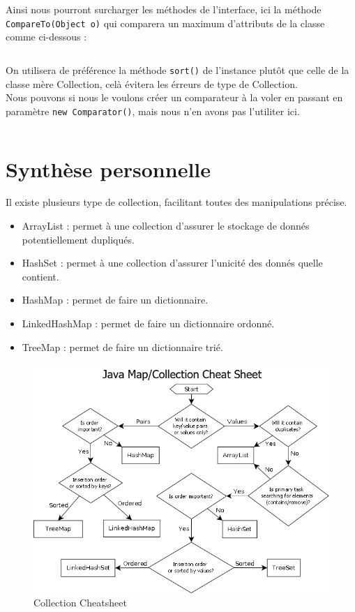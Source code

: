 Ainsi nous pourront surcharger les méthodes de l'interface, ici la méthode \texttt{CompareTo(Object o)} qui comparera un maximum d'attributs de la classe comme ci-dessous :
\inputminted[linenos,firstline=52,lastline=63]{java}{../sources/src/tp2/Cours.java}

On utilisera de préférence la méthode \texttt{sort()} de l'instance plutôt que celle de la classe mère Collection, celà évitera les érreurs de type de Collection.\\
Nous pouvons si nous le voulons créer un comparateur à la voler en passant en paramètre \texttt{new Comparator(){}}, mais nous n'en avons pas l'utiliter ici.
\inputminted[linenos,firstline=43,lastline=43]{java}{../sources/src/tp2/Main.java}

\section{Synthèse personnelle}

Il existe plusieurs type de collection, facilitant toutes des manipulations précise.
\begin{itemize}
  \item ArrayList : permet à une collection d'assurer le stockage de donnés potentiellement dupliqués.
  \item HashSet : permet à une collection d'assurer l'unicité des donnés quelle contient.
  \item HashMap : permet de faire un dictionnaire.
  \item LinkedHashMap : permet de faire un dictionnaire ordonné.
  \item TreeMap : permet de faire un dictionnaire trié.
\end{itemize}

\begin{figure}[H]
  \centering
  \includegraphics[width=400pt]{./tp/Pictures/tp2-collection-cheatsheet}
  \caption{Collection Cheatsheet}
  \label{Collection Cheatsheet}
\end{figure}

